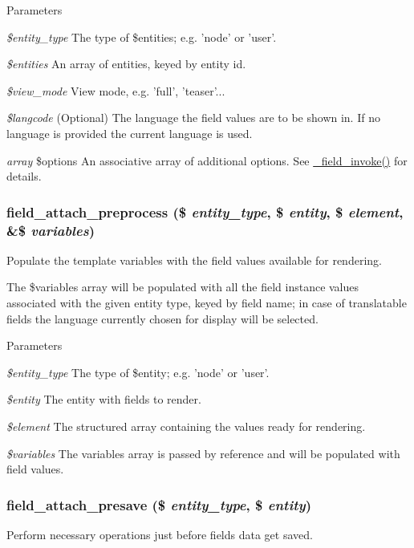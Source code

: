 \begin{DoxyParams}{Parameters}
\item[{\em \$entity\_\-type}]The type of \$entities; e.g. 'node' or 'user'. \item[{\em \$entities}]An array of entities, keyed by entity id. \item[{\em \$view\_\-mode}]View mode, e.g. 'full', 'teaser'... \item[{\em \$langcode}](Optional) The language the field values are to be shown in. If no language is provided the current language is used. \item[{\em array}]\$options An associative array of additional options. See \hyperlink{group__field__attach_ga65f891a5eea6513f8505f5cfc5894896}{\_\-field\_\-invoke()} for details. \end{DoxyParams}
\hypertarget{group__field__attach_ga46c512cf3ddf3937a78f9c7a0da4dce6}{
\subsubsection[{field\_\-attach\_\-preprocess}]{\setlength{\rightskip}{0pt plus 5cm}field\_\-attach\_\-preprocess (\$ {\em entity\_\-type}, \/  \$ {\em entity}, \/  \$ {\em element}, \/  \&\$ {\em variables})}}
\label{group__field__attach_ga46c512cf3ddf3937a78f9c7a0da4dce6}
Populate the template variables with the field values available for rendering.

The \$variables array will be populated with all the field instance values associated with the given entity type, keyed by field name; in case of translatable fields the language currently chosen for display will be selected.


\begin{DoxyParams}{Parameters}
\item[{\em \$entity\_\-type}]The type of \$entity; e.g. 'node' or 'user'. \item[{\em \$entity}]The entity with fields to render. \item[{\em \$element}]The structured array containing the values ready for rendering. \item[{\em \$variables}]The variables array is passed by reference and will be populated with field values. \end{DoxyParams}
\hypertarget{group__field__attach_ga8f3ecf532dc49f8aed138695489fc81d}{
\subsubsection[{field\_\-attach\_\-presave}]{\setlength{\rightskip}{0pt plus 5cm}field\_\-attach\_\-presave (\$ {\em entity\_\-type}, \/  \$ {\em entity})}}
\label{group__field__attach_ga8f3ecf532dc49f8aed138695489fc81d}
Perform necessary operations just before fields data get saved.

